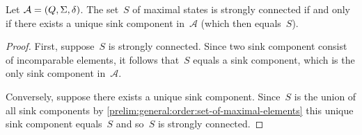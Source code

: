 \begin{proposition} \label{prelim:prop:maximal-states-SCC}
	Let $\mathcal A = (Q, \Sigma, \delta)$. The set~$S$ of maximal states 
	is strongly connected if and only if 
	there exists a unique sink component in~$\mathcal A$ (which then equals~$S$).	
\end{proposition}
\begin{proof}
	First, suppose~$S$ is strongly connected.
	Since two sink component consist of incomparable 
	elements, it follows that~$S$ equals
	a sink component, which is the only sink component in~$\mathcal A$.
	
	Conversely, suppose there exists a unique sink component.
	Since~$S$ is the union of all sink components by \cref{prelim:general:order:set-of-maximal-elements}
	this unique sink component equals~$S$ and so~$S$ is strongly connected.	
\end{proof}